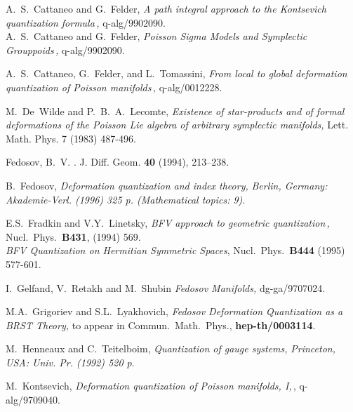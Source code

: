 \documentclass[a4paper,11pt]{amsart}
\numberwithin{thm}{section} %
\numberwithin{equation}{section} %
\numberwithin{figure}{section} %
\def\CMP{Commun.\ Math.\ Phys.}
\renewcommand{\:}{{\rm\, :\,}}
\begin{document}
\begin{thebibliography}{33}
\bibitem{[CF]} A.~S.~Cattaneo and G.~Felder,
{\em A path integral approach to the Kontsevich quantization
formula\,,} q-alg/9902090.\\
A.~S.~Cattaneo and G.~Felder,
{\em Poisson Sigma Models and Symplectic Grouppoids\,,} q-alg/9902090.


\bibitem{[CFT]} A.~S.~Cattaneo, G.~Felder, and L.~Tomassini,
{\em From local to global deformation quantization of Poisson
 manifolds\,,} q-alg/0012228.


\bibitem{[DWL]}
M.~De~Wilde and P.~B.~A.~Lecomte,
{\em Existence of star-products
and of formal deformations of the Poisson Lie algebra of arbitrary
symplectic manifolds,}
 Lett. Math. Phys. 7 (1983) 487-496.


Fedosov, B.~V. .
\newblock J. Diff. Geom.  {\bf 40} (1994), 213--238.

 B.~Fedosov,
{\em Deformation quantization and index theory,}
{\it  Berlin, Germany: Akademie-Verl. (1996) 325 p. (Mathematical
  topics: 9)}.


\bibitem{[FL]}
E.S.~Fradkin and V.Y.~Linetsky,
{\em BFV approach to geometric quantization\,,}
Nucl.\ Phys.\ {\bf B431}, (1994) 569.\\
{\em BFV Quantization on Hermitian Symmetric Spaces},
Nucl.\ Phys.\ {\bf B444} (1995) 577-601.

\bibitem{[GRS]} I.~Gelfand, V.~Retakh and M.~Shubin
{\em Fedosov Manifolds,} dg-ga/9707024.


\bibitem{[GL]} M.A.~Grigoriev and S.L.~Lyakhovich,
{\em Fedosov Deformation Quantization as a BRST Theory,}
to appear in \CMP{,} {\bf hep-th/0003114}.


\bibitem{[HT]} M.~Henneaux and C.~Teitelboim,
{\em Quantization of gauge systems,}
{\it  Princeton, USA: Univ. Pr. (1992) 520 p}.

\bibitem{[Kontsevich]}
M.~Kontsevich,
{\em Deformation quantization of Poisson manifolds, I,}\,,
q-alg/9709040.

\end{thebibliography}
\end{document}
